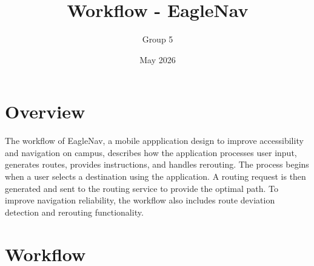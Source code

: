 \documentclass{article}
\title{Workflow - EagleNav}
\author{Group 5}
\date{May 2026}
\begin{document}
\maketitle

\section{Overview}
The workflow of EagleNav, a mobile appplication design to improve accessibility and navigation on campus, describes how the application processes
user input, generates routes, provides instructions, and handles rerouting. The process begins when a user selects a destination using the application.
A routing request is then generated and sent to the routing service to provide the optimal path. To improve navigation
reliability, the workflow also includes route deviation detection and rerouting functionality. 

\section{Workflow}
\end{document}
